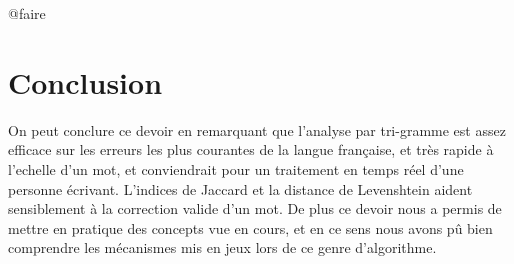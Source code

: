 \documentclass[french,12pt,a4]{report}
\begin{document}
@faire



\chapter{Conclusion}

On peut conclure ce devoir en remarquant que l'analyse par tri-gramme
est assez efficace sur les erreurs les plus courantes de la langue
française, et très rapide à l'echelle d'un mot, et conviendrait pour
un traitement en temps réel d'une personne écrivant. L'indices de Jaccard et la distance de
Levenshtein aident sensiblement à la correction valide d'un mot. De
plus ce devoir nous a permis de mettre en pratique des concepts vue en
cours, et en ce sens nous avons pû bien comprendre les mécanismes mis
en jeux lors de ce genre d'algorithme.
\end{document}
